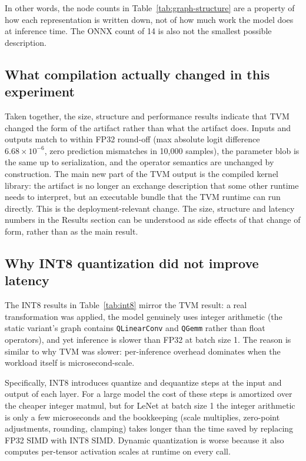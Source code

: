 \documentclass[fleqn,10pt]{olplainarticle}
\begin{document}
In other words, the node counts in Table~\ref{tab:graph-structure} are a property of how each representation is written down, not of how much work the model does at inference time. The ONNX count of 14 is also not the smallest possible description.

\subsection{What compilation actually changed in this experiment}

Taken together, the size, structure and performance results indicate that TVM changed the form of the artifact rather than what the artifact does. Inputs and outputs match to within FP32 round-off (max absolute logit difference $6.68 \times 10^{-6}$, zero prediction mismatches in 10{,}000 samples), the parameter blob is the same up to serialization, and the operator semantics are unchanged by construction. The main new part of the TVM output is the compiled kernel library: the artifact is no longer an exchange description that some other runtime needs to interpret, but an executable bundle that the TVM runtime can run directly. This is the deployment-relevant change. The size, structure and latency numbers in the Results section can be understood as side effects of that change of form, rather than as the main result.

\subsection{Why INT8 quantization did not improve latency}

The INT8 results in Table~\ref{tab:int8} mirror the TVM result: a real transformation was applied, the model genuinely uses integer arithmetic (the static variant's graph contains \texttt{QLinearConv} and \texttt{QGemm} rather than float operators), and yet inference is slower than FP32 at batch size 1. The reason is similar to why TVM was slower: per-inference overhead dominates when the workload itself is microsecond-scale.

Specifically, INT8 introduces quantize and dequantize steps at the input and output of each layer. For a large model the cost of these steps is amortized over the cheaper integer matmul, but for LeNet at batch size 1 the integer arithmetic is only a few microseconds and the bookkeeping (scale multiplies, zero-point adjustments, rounding, clamping) takes longer than the time saved by replacing FP32 SIMD with INT8 SIMD. Dynamic quantization is worse because it also computes per-tensor activation scales at runtime on every call.
\end{document}
